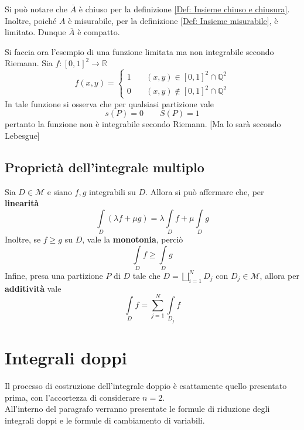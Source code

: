 \begin{oss}
    Si può notare che $\overline{A}$ è chiuso per la definizione \ref{Def: Insieme chiuso e chiusura}. Inoltre, poiché $A$ è misurabile, per la definizione \ref{Def: Insieme misurabile}, è limitato. Dunque $\overline{A}$ è compatto.
\end{oss}
\begin{example}
    Si faccia ora l'esempio di una funzione limitata ma non integrabile secondo Riemann. Sia $f: [0,1]^2 \to \mathbb{R}$
    \begin{equation*}
    f(x, y)=\begin{cases}
        1 \quad & (x,y) \in [0,1]^2 \cap \mathbb{Q}^2\\
        0 \quad & (x,y) \notin [0,1]^2 \cap \mathbb{Q}^2
    \end{cases}
    \end{equation*}
    In tale funzione si osserva che per qualsiasi partizione vale
    \begin{equation*}
        s(P)=0 \qquad S(P)=1 
    \end{equation*}
    pertanto la funzione non è integrabile secondo Riemann. [Ma lo sarà secondo Lebesgue]
\end{example}
\subsection{Proprietà dell'integrale multiplo}
Sia $D \in \mathcal{M}$ e siano $f, g$ integrabili su $D$.
Allora si può affermare che, per \textbf{linearità}
\begin{equation}
    \int\limits_D{(\lambda f+ \mu g)}= \lambda \int\limits_D{f}+ \mu \int\limits_D g
\end{equation}
Inoltre, se $ f \geq g$ su $D$, vale la \textbf{monotonia}, perciò
\begin{equation}
    \int\limits_D{f} \geq \int\limits_D{g}
\end{equation}
Infine, presa una partizione $P$ di $D$ tale che $D= \bigsqcup\limits_{i=1}^{N} D_j$ con $D_j \in \mathcal{M}$, allora per \textbf{additività} vale
\begin{equation}
    \int\limits_D{f}= \sum\limits_{j=1}^{N}{\int\limits_{D_j}{f}}
\end{equation}
\section{Integrali doppi}
Il processo di costruzione dell'integrale doppio è esattamente quello presentato prima, con l'accortezza di considerare $n=2$.\\
All'interno del paragrafo verranno presentate le formule di riduzione degli integrali doppi e le formule di cambiamento di variabili.
